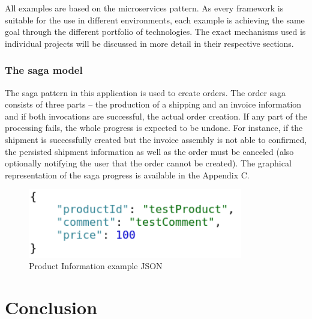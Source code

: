 \documentclass[oneside,
  digital, %
  table,   %
  nolof,     %
  nolot,     %
]{fithesis3}
\begin{document}
All examples are based on the microservices pattern. As every framework is suitable for the use in different environments, each example is achieving the same goal through the different portfolio of technologies. The exact mechanisms used is individual projects will be discussed in more detail in their respective sections.

\subsection{The saga model}

The saga pattern in this application is used to create orders. The order saga consists of three parts -- the production of a shipping and an invoice information and if both invocations are successful, the actual order creation. If any part of the processing fails, the whole progress is expected to be undone. For instance, if the shipment is successfully created but the invoice assembly is not able to confirmed, the persisted shipment information as well as the order must be canceled (also optionally notifying the user that the order cannot be created). The graphical representation of the saga progress is available in the Appendix C.


\begin{figure}
	\begin{center}
		\includegraphics[height=30mm]{images/productInfoJSON.png}
	\end{center}
	\caption{Product Information example JSON}
\end{figure}


\chapter{Conclusion}



\makeatletter\thesis@blocks@clear\makeatother
{} %
\printindex




\appendix %
\end{document}
